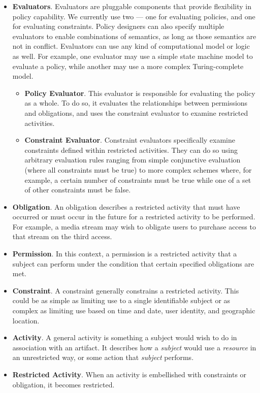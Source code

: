 \begin{itemize}
\item \textbf{Evaluators}.  Evaluators are pluggable components that provide flexibility in policy capability.  We currently use two --- one for evaluating policies, and one for evaluating constraints.  Policy designers can also specify multiple evaluators to enable combinations of semantics, as long as those semantics are not in conflict.  Evaluators can use any kind of computational model or logic as well.  For example, one evaluator may use a simple state machine model to evaluate a policy, while another may use a more complex Turing-complete model.
\begin{itemize}
\item \textbf{Policy Evaluator}.  This evaluator is responsible for evaluating the policy as a whole.  To do so, it evaluates the relationships between permissions and obligations, and uses the constraint evaluator to examine restricted activities.
\item \textbf{Constraint Evaluator}.  Constraint evaluators specifically examine constraints defined within restricted activities.  They can do so using arbitrary evaluation rules ranging from simple conjunctive evaluation (where all constraints must be true) to more complex schemes where, for example, a certain number of constraints must be true while one of a set of other constraints must be false.
\end{itemize}
\item \textbf{Obligation}.  An obligation describes a restricted activity that must have occurred or must occur in the future for a restricted activity to be performed.  For example, a media stream may wish to obligate users to purchase access to that stream on the third access.
\item \textbf{Permission}.  In this context, a permission is a restricted activity that a subject can perform under the condition that certain specified obligations are met.
\item \textbf{Constraint}.  A constraint generally constrains a restricted activity.  This could be as simple as limiting use to a single identifiable subject or as complex as limiting use based on time and date, user identity, and geographic location.
\item \textbf{Activity}.  A general activity is something a subject would wish to do in association with an artifact.  It describes how a \emph{subject} would use a \emph{resource} in an unrestricted way, or some action that \emph{subject} performs.
\item \textbf{Restricted Activity}.  When an activity is embellished with constraints or obligation, it becomes restricted.
\end{itemize}


